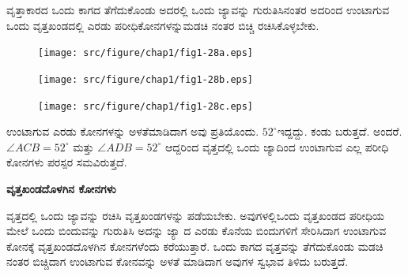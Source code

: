  ವೃತ್ತಾಕಾರದ ಒಂದು ಕಾಗದ ತೆಗೆದುಕೊಂಡು ಅದರಲ್ಲಿ ಒಂದು ಜ್ಯಾವನ್ನು ಗುರುತಿಸಿ\break ನಂತರ ಅದರಿಂದ ಉಂಟಾಗುವ ಒಂದು ವೃತ್ತಖಂಡದಲ್ಲಿ ಎರಡು ಪರೀಧಿಕೋನಗಳನ್ನು\break ಮಡಚಿ ನಂತರ ಬಿಚ್ಚಿ ರಚಿಸಿಕೊಳ್ಳಬೇಕು.
 \begin{figure}[H]
\centering
\texttt{[image: src/figure/chap1/fig1-28a.eps]}
\end{figure}
 \begin{figure}[H]
\centering
\texttt{[image: src/figure/chap1/fig1-28b.eps]}
\end{figure}
\begin{figure}[H]
\centering
\texttt{[image: src/figure/chap1/fig1-28c.eps]}
\end{figure}

 ಉಂಟಾಗುವ ಎರಡು ಕೋನಗಳನ್ನು ಅಳತೆಮಾಡಿದಾಗ ಅವು ಪ್ರತಿಯೊಂದು. $52^\circ$\break ಇದ್ದದ್ದು. ಕಂಡು ಬರುತ್ತದೆ. ಅಂದರೆ. $\angle ACB = 52^\circ$ ಮತ್ತು  $\angle ADB = 52^\circ$ ಆದ್ದರಿಂದ ವೃತ್ತದಲ್ಲಿ ಒಂದು ಜ್ಯಾದಿಂದ ಉಂಟಾಗುವ ಎಲ್ಲ ಪರೀಧಿ ಕೋನಗಳು ಪರಸ್ಪರ ಸಮವಿರುತ್ತದೆ. 
 
 \noindent
  \textbf{ವೃತ್ತಖಂಡದೊಳಗಿನ ಕೋನಗಳು}
  
  ವೃತ್ತದಲ್ಲಿ ಒಂದು ಜ್ಯಾವನ್ನು ರಚಿಸಿ ವೃತ್ತಖಂಡಗಳನ್ನು ಪಡೆಯಬೇಕು. ಅವುಗಳಲ್ಲಿ\break ಒಂದು ವೃತ್ತಖಂಡದ ಪರೀಧಿಯ ಮೇಲೆ ಒಂದು ಬಿಂದುವನ್ನು ಗುರುತಿಸಿ ಅದನ್ನು ಜ್ಯಾ ದ ಎರಡು ಕೊನೆಯ ಬಿಂದುಗಳಿಗೆ ಸೇರಿಸಿದಾಗ ಉಂಟಾಗುವ ಕೋನಕ್ಕೆ ವೃತ್ತಖಂಡದೊಳಗಿನ ಕೋನಗಳೆಂದು ಕರೆಯುತ್ತಾರೆ. ಒಂದು ಕಾಗದ ವೃತ್ತವನ್ನು ತೆಗೆದುಕೊಂಡು ಮಡಚಿ ನಂತರ ಬಿಚ್ಚಿದಾಗ ಉಂಟಾಗುವ ಕೋನವನ್ನು ಅಳತೆ ಮಾಡಿದಾಗ ಅವುಗಳ ಸ್ವಭಾವ ತಿಳಿದು ಬರುತ್ತದೆ. 
  
